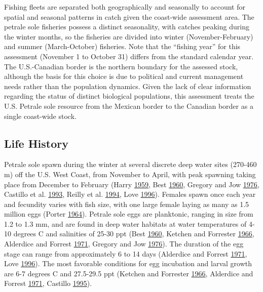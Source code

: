 \documentclass[12pt,]{article}
\begin{document}
Fishing fleets are separated both geographically and seasonally to
account for spatial and seasonal patterns in catch given the coast-wide
assessment area. The petrale sole fisheries possess a distinct
seasonality, with catches peaking during the winter months, so the
fisheries are divided into winter (November-February) and summer
(March-October) fisheries. Note that the ``fishing year'' for this
assessment (November 1 to October 31) differs from the standard calendar
year. The U.S.-Canadian border is the northern boundary for the assessed
stock, although the basis for this choice is due to political and
current management needs rather than the population dynamics. Given the
lack of clear information regarding the status of distinct biological
populations, this assessment treats the U.S. Petrale sole resource from
the Mexican border to the Canadian border as a single coast-wide stock.

\subsection{Life History}\label{life-history}

Petrale sole spawn during the winter at several discrete deep water
sites (270-460 m) off the U.S. West Coast, from November to April, with
peak spawning taking place from December to February (Harry
\protect\hyperlink{ref-harry_time_1959}{1959}, Best
\protect\hyperlink{ref-best_petrale_1960}{1960}, Gregory and Jow
\protect\hyperlink{ref-gregory_validity_1976}{1976}, Castillo et al.
\protect\hyperlink{ref-castillo_g.c._environmental_1993}{1993}, Reilly
et al. \protect\hyperlink{ref-reilly_recreational_1994}{1994}, Love
\protect\hyperlink{ref-love_milton_probably_1996}{1996}). Females spawn
once each year and fecundity varies with fish size, with one large
female laying as many as 1.5 million eggs (Porter
\protect\hyperlink{ref-porter_notes_1964}{1964}). Petrale sole eggs are
planktonic, ranging in size from 1.2 to 1.3 mm, and are found in deep
water habitats at water temperatures of 4-10 degrees C and salinities of
25-30 ppt (Best \protect\hyperlink{ref-best_petrale_1960}{1960}, Ketchen
and Forrester \protect\hyperlink{ref-ketchen_population_1966}{1966},
Alderdice and Forrest
\protect\hyperlink{ref-alderdice_effects_1971}{1971}, Gregory and Jow
\protect\hyperlink{ref-gregory_validity_1976}{1976}). The duration of
the egg stage can range from approximately 6 to 14 days (Alderdice and
Forrest \protect\hyperlink{ref-alderdice_effects_1971}{1971}, Love
\protect\hyperlink{ref-love_milton_probably_1996}{1996}). The most
favorable conditions for egg incubation and larval growth are 6-7
degrees C and 27.5-29.5 ppt (Ketchen and Forrester
\protect\hyperlink{ref-ketchen_population_1966}{1966}, Alderdice and
Forrest \protect\hyperlink{ref-alderdice_effects_1971}{1971}, Castillo
\protect\hyperlink{ref-castillo_latitudinal_1995}{1995}).
\end{document}
